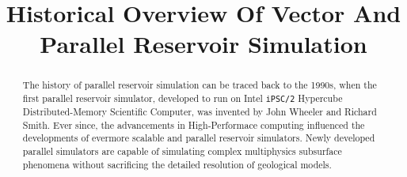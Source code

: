 \documentclass[barcolor=BrickRed,nocopyright,nolists]{asmejour}
\begin{document}

\title{Historical Overview Of Vector And Parallel Reservoir Simulation}

   
\begin{abstract}
	The history of parallel reservoir simulation can be traced back to the 1990s, when the first 
	parallel reservoir simulator, developed to run on Intel \texttt{iPSC/2} Hypercube Distributed-Memory Scientific Computer,
	was invented by John Wheeler and Richard Smith\cite{spe19804}. Ever since, the advancements in High-Performace computing
	influenced the developments of evermore scalable and parallel reservoir simulators. Newly developed parallel simulators
	are capable of simulating complex multiphysics subsurface phenomena without sacrificing the detailed resolution of 
	geological models.
\end{abstract}
							
\maketitle %

\end{document}
